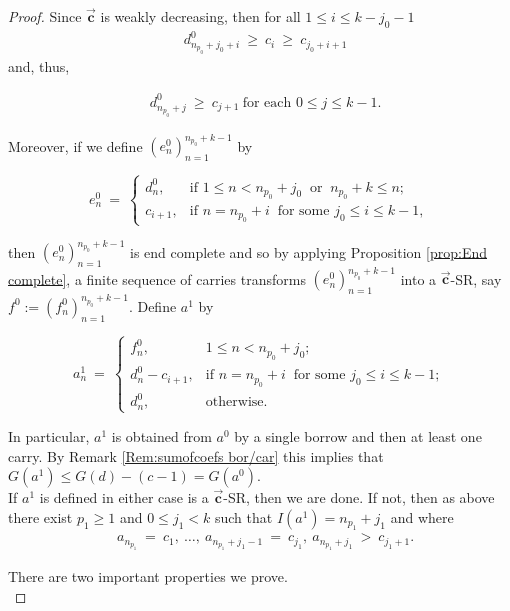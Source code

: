 \documentclass[]{interact}
\newcommand{\vtr}[1]{\vec{\mathbf{#1}}}
\theoremstyle{plain}
\numberwithin{equation}{section} %
\numberwithin{table}{section} %
\numberwithin{figure}{section}
\begin{document}
\begin{proof}
  \noindent Since $\vtr{c}$ is weakly decreasing, then for all $1\leq  i\leq k-j_0-1$ 
\begin{align*}
    &d^0_{n_{p_0} +j_0 +i}\ \geq\ c_{i}\ \geq\ c_{j_0+i+1}
 \end{align*}
and, thus,

\begin{align}
    &d^0_{n_{p_0} +j}\ \geq\ c_{j+1}\ \text{for each }0\leq j\leq k-1.
 \end{align}

\noindent Moreover, if we define $(e^0_n)_{n=1}^{n_{p_0} + k-1}$ by

$$e^0_n\ =\ \begin{cases}
        d^0_n, & \text{if  }1\leq n< n_{p_0}+j_0\ \text{ or }\ n_{p_0}+k\leq n;\\
        c_{i+1}, & \text{if  } n=n_{p_0}+i\ \text{ for some }j_0\leq i\leq k-1,
    \end{cases}$$

\noindent then $(e^0_n)_{n=1}^{n_{p_0} + k-1}$ is end complete and so by applying Proposition \textcolor{blue}{\ref{prop:End complete}}, a finite sequence of carries transforms $(e^0_n)_{n=1}^{n_{p_0} + k-1}$ into a $\vtr{c}$-SR, say $f^0:=(f^0_n)_{n=1}^{n_{p_0} + k-1}$. Define $a^1$ by

    $$a_n^{1}\ =\ \begin{cases}
        f^0_n, & 1\leq n< n_{p_0}+j_0;\\
        d^0_n-c_{i+1}, & \text{if } n=n_{p_0}+i\ \text{ for some }j_0\leq i\leq k-1;\\        d^0_n, & \text{otherwise.}
    \end{cases}$$

    \noindent In particular, $a^1$ is obtained from $a^0$ by a single borrow and then at least one carry. By Remark \textcolor{blue}{\ref{Rem:sumofcoefs bor/car}} this implies that $G(a^1)\leq G(d)-(c-1)=G(a^0)$.\\
    
    
If $a^1$ is defined in either case is a $\vtr{c}$-SR, then we are done. If not, then as above there exist $p_1\geq 1$ and $0\leq j_1< k$ such that $I(a^1)=n_{p_1}+j_1$ and where
\begin{align}
    & a_{n_{p_1}}\ =\ c_1,\ \ldots,\ a_{n_{p_1} + j_1 -1}\ =\ c_{j_1},\  a_{n_{p_1}  + j_1}\ >\ c_{j_1+1}. \label{eq:4} 
\end{align}

There are two important properties we prove.\\


\end{proof}
\end{document}
